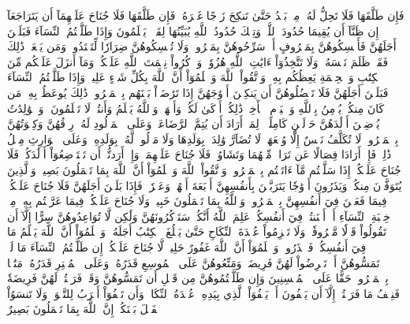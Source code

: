 فَإِن طَلَّقَهَا فَلَا تَحِلُّ لَهُۥ مِنۢ بَعۡدُ حَتَّىٰ تَنكِحَ زَوۡجًا غَيۡرَهُۥۗ فَإِن طَلَّقَهَا فَلَا جُنَاحَ عَلَيۡهِمَآ أَن يَتَرَاجَعَآ إِن ظَنَّآ أَن يُقِيمَا حُدُودَ ٱللَّهِۗ وَتِلۡكَ حُدُودُ ٱللَّهِ يُبَيِّنُهَا لِقَوۡمٖ يَعۡلَمُونَ
وَإِذَا طَلَّقۡتُمُ ٱلنِّسَآءَ فَبَلَغۡنَ أَجَلَهُنَّ فَأَمۡسِكُوهُنَّ بِمَعۡرُوفٍ أَوۡ سَرِّحُوهُنَّ بِمَعۡرُوفٖۚ وَلَا تُمۡسِكُوهُنَّ ضِرَارٗا لِّتَعۡتَدُواْۚ وَمَن يَفۡعَلۡ ذَٰلِكَ فَقَدۡ ظَلَمَ نَفۡسَهُۥۚ وَلَا تَتَّخِذُوٓاْ ءَايَٰتِ ٱللَّهِ هُزُوٗاۚ وَٱذۡكُرُواْ نِعۡمَتَ ٱللَّهِ عَلَيۡكُمۡ وَمَآ أَنزَلَ عَلَيۡكُم مِّنَ ٱلۡكِتَٰبِ وَٱلۡحِكۡمَةِ يَعِظُكُم بِهِۦۚ وَٱتَّقُواْ ٱللَّهَ وَٱعۡلَمُوٓاْ أَنَّ ٱللَّهَ بِكُلِّ شَيۡءٍ عَلِيمٞ
وَإِذَا طَلَّقۡتُمُ ٱلنِّسَآءَ فَبَلَغۡنَ أَجَلَهُنَّ فَلَا تَعۡضُلُوهُنَّ أَن يَنكِحۡنَ أَزۡوَٰجَهُنَّ إِذَا تَرَٰضَوۡاْ بَيۡنَهُم بِٱلۡمَعۡرُوفِۗ ذَٰلِكَ يُوعَظُ بِهِۦ مَن كَانَ مِنكُمۡ يُؤۡمِنُ بِٱللَّهِ وَٱلۡيَوۡمِ ٱلۡأٓخِرِۗ ذَٰلِكُمۡ أَزۡكَىٰ لَكُمۡ وَأَطۡهَرُۚ وَٱللَّهُ يَعۡلَمُ وَأَنتُمۡ لَا تَعۡلَمُونَ
۞وَٱلۡوَٰلِدَٰتُ يُرۡضِعۡنَ أَوۡلَٰدَهُنَّ حَوۡلَيۡنِ كَامِلَيۡنِۖ لِمَنۡ أَرَادَ أَن يُتِمَّ ٱلرَّضَاعَةَۚ وَعَلَى ٱلۡمَوۡلُودِ لَهُۥ رِزۡقُهُنَّ وَكِسۡوَتُهُنَّ بِٱلۡمَعۡرُوفِۚ لَا تُكَلَّفُ نَفۡسٌ إِلَّا وُسۡعَهَاۚ لَا تُضَآرَّ وَٰلِدَةُۢ بِوَلَدِهَا وَلَا مَوۡلُودٞ لَّهُۥ بِوَلَدِهِۦۚ وَعَلَى ٱلۡوَارِثِ مِثۡلُ ذَٰلِكَۗ فَإِنۡ أَرَادَا فِصَالًا عَن تَرَاضٖ مِّنۡهُمَا وَتَشَاوُرٖ فَلَا جُنَاحَ عَلَيۡهِمَاۗ وَإِنۡ أَرَدتُّمۡ أَن تَسۡتَرۡضِعُوٓاْ أَوۡلَٰدَكُمۡ فَلَا جُنَاحَ عَلَيۡكُمۡ إِذَا سَلَّمۡتُم مَّآ ءَاتَيۡتُم بِٱلۡمَعۡرُوفِۗ وَٱتَّقُواْ ٱللَّهَ وَٱعۡلَمُوٓاْ أَنَّ ٱللَّهَ بِمَا تَعۡمَلُونَ بَصِيرٞ
وَٱلَّذِينَ يُتَوَفَّوۡنَ مِنكُمۡ وَيَذَرُونَ أَزۡوَٰجٗا يَتَرَبَّصۡنَ بِأَنفُسِهِنَّ أَرۡبَعَةَ أَشۡهُرٖ وَعَشۡرٗاۖ فَإِذَا بَلَغۡنَ أَجَلَهُنَّ فَلَا جُنَاحَ عَلَيۡكُمۡ فِيمَا فَعَلۡنَ فِيٓ أَنفُسِهِنَّ بِٱلۡمَعۡرُوفِۗ وَٱللَّهُ بِمَا تَعۡمَلُونَ خَبِيرٞ
وَلَا جُنَاحَ عَلَيۡكُمۡ فِيمَا عَرَّضۡتُم بِهِۦ مِنۡ خِطۡبَةِ ٱلنِّسَآءِ أَوۡ أَكۡنَنتُمۡ فِيٓ أَنفُسِكُمۡۚ عَلِمَ ٱللَّهُ أَنَّكُمۡ سَتَذۡكُرُونَهُنَّ وَلَٰكِن لَّا تُوَاعِدُوهُنَّ سِرًّا إِلَّآ أَن تَقُولُواْ قَوۡلٗا مَّعۡرُوفٗاۚ وَلَا تَعۡزِمُواْ عُقۡدَةَ ٱلنِّكَاحِ حَتَّىٰ يَبۡلُغَ ٱلۡكِتَٰبُ أَجَلَهُۥۚ وَٱعۡلَمُوٓاْ أَنَّ ٱللَّهَ يَعۡلَمُ مَا فِيٓ أَنفُسِكُمۡ فَٱحۡذَرُوهُۚ وَٱعۡلَمُوٓاْ أَنَّ ٱللَّهَ غَفُورٌ حَلِيمٞ
لَّا جُنَاحَ عَلَيۡكُمۡ إِن طَلَّقۡتُمُ ٱلنِّسَآءَ مَا لَمۡ تَمَسُّوهُنَّ أَوۡ تَفۡرِضُواْ لَهُنَّ فَرِيضَةٗۚ وَمَتِّعُوهُنَّ عَلَى ٱلۡمُوسِعِ قَدَرُهُۥ وَعَلَى ٱلۡمُقۡتِرِ قَدَرُهُۥ مَتَٰعَۢا بِٱلۡمَعۡرُوفِۖ حَقًّا عَلَى ٱلۡمُحۡسِنِينَ
وَإِن طَلَّقۡتُمُوهُنَّ مِن قَبۡلِ أَن تَمَسُّوهُنَّ وَقَدۡ فَرَضۡتُمۡ لَهُنَّ فَرِيضَةٗ فَنِصۡفُ مَا فَرَضۡتُمۡ إِلَّآ أَن يَعۡفُونَ أَوۡ يَعۡفُوَاْ ٱلَّذِي بِيَدِهِۦ عُقۡدَةُ ٱلنِّكَاحِۚ وَأَن تَعۡفُوٓاْ أَقۡرَبُ لِلتَّقۡوَىٰۚ وَلَا تَنسَوُاْ ٱلۡفَضۡلَ بَيۡنَكُمۡۚ إِنَّ ٱللَّهَ بِمَا تَعۡمَلُونَ بَصِيرٌ

